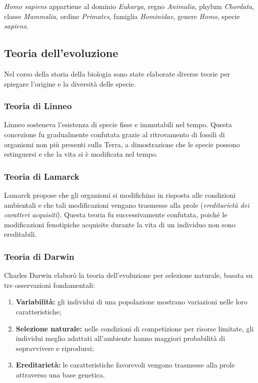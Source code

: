\documentclass[11pt,a4paper,openright,twoside]{book}
\theoremstyle{definition}
\theoremstyle{plain}
\theoremstyle{remark}
\begin{document}
\begin{tcolorbox}[exbox, title={Esempio: classificazione dell'essere umano}]
  \textit{Homo sapiens} appartiene al dominio \textit{Eukarya}, regno \textit{Animalia}, phylum \textit{Chordata}, classe \textit{Mammalia}, ordine \textit{Primates}, famiglia \textit{Hominidae}, genere \textit{Homo}, specie \textit{sapiens}.
\end{tcolorbox}

\subsection{Teoria dell'evoluzione}

Nel corso della storia della biologia sono state elaborate diverse teorie per spiegare l'origine e la diversità delle specie.

\subsubsection{Teoria di Linneo}
Linneo sosteneva l'esistenza di specie fisse e immutabili nel tempo. Questa concezione fu gradualmente confutata grazie al ritrovamento di fossili di organismi non più presenti sulla Terra, a dimostrazione che le specie possono estinguersi e che la vita si è modificata nel tempo.

\subsubsection{Teoria di Lamarck}
Lamarck propose che gli organismi si modifichino in risposta alle condizioni ambientali e che tali modificazioni vengano trasmesse alla prole (\textit{ereditarietà dei caratteri acquisiti}). Questa teoria fu successivamente confutata, poiché le modificazioni fenotipiche acquisite durante la vita di un individuo non sono ereditabili.

\subsubsection{Teoria di Darwin}
Charles Darwin elaborò la teoria dell'evoluzione per selezione naturale, basata su tre osservazioni fondamentali:
\begin{enumerate}
  \item \textbf{Variabilità:} gli individui di una popolazione mostrano variazioni nelle loro caratteristiche;
  \item \textbf{Selezione naturale:} nelle condizioni di competizione per risorse limitate, gli individui meglio adattati all'ambiente hanno maggiori probabilità di sopravvivere e riprodursi;
  \item \textbf{Ereditarietà:} le caratteristiche favorevoli vengono trasmesse alla prole attraverso una base genetica.
\end{enumerate}
\end{document}
